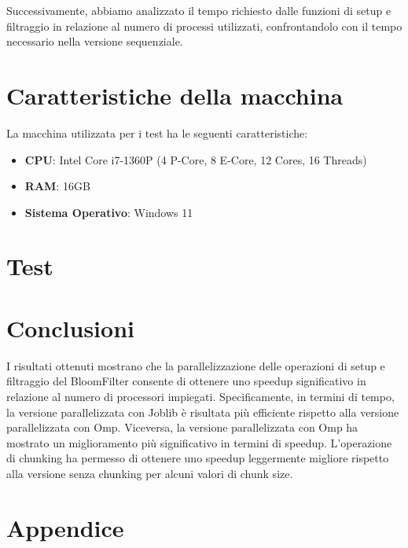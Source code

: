 \documentclass[11pt]{article}
\begin{document}
    Successivamente, abbiamo analizzato il tempo richiesto dalle funzioni di setup e filtraggio in relazione al numero
    di processi utilizzati, confrontandolo con il tempo necessario nella versione sequenziale.
    
    

    \section{Caratteristiche della macchina}\label{sec:caratteristiche-della-macchina}
    La macchina utilizzata per i test ha le seguenti caratteristiche:
    \begin{itemize}
        \item \textbf{CPU}: Intel Core i7-1360P (4 P-Core, 8 E-Core, 12 Cores, 16 Threads)
        \item \textbf{RAM}: 16GB
        \item \textbf{Sistema Operativo}: Windows 11
    \end{itemize}

    \clearpage

    \section{Test}\label{sec:test}
    

    \clearpage
    \section{Conclusioni}\label{sec:conclusioni}
    I risultati ottenuti mostrano che la parallelizzazione delle operazioni di setup e filtraggio del BloomFilter
    consente di ottenere uno speedup significativo in relazione al numero di processori impiegati.
    Specificamente, in termini di tempo, la versione parallelizzata con Joblib è risultata più efficiente rispetto
    alla versione parallelizzata con Omp.
    Viceversa, la versione parallelizzata con Omp ha mostrato un miglioramento più significativo in termini di speedup.
    L'operazione di chunking ha permesso di ottenere uno speedup leggermente migliore rispetto alla versione senza chunking
    per alcuni valori di chunk size.

    \clearpage
    \section{Appendice}\label{sec:appendice}
    
\end{document}
